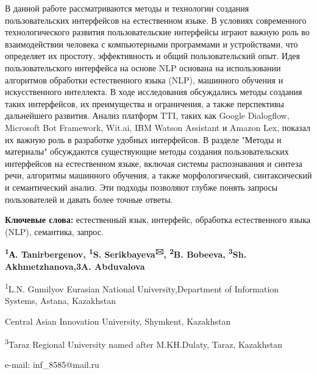 В данной работе рассматриваются методы и технологии создания
пользовательских интерфейсов на естественном языке. В условиях
современного технологического развития пользовательские интерфейсы
играют важную роль во взаимодействии человека с компьютерными
программами и устройствами, что определяет их простоту, эффективность и
общий пользовательский опыт. Идея пользовательского интерфейса на основе
NLP основана на использовании алгоритмов обработки естественного языка
(NLP), машинного обучения и искусственного интеллекта. В ходе
исследования обсуждались методы создания таких интерфейсов, их
преимущества и ограничения, а также перспективы дальнейшего развития.
Анализ платформ TTI, таких как Google Dialogflow, Microsoft Bot
Framework, Wit.ai, IBM Watson Assistant и Amazon Lex, показал их важную
роль в разработке удобных интерфейсов. В разделе "Методы и материалы"
обсуждаются существующие методы создания пользовательских интерфейсов на
естественном языке, включая системы распознавания и синтеза речи,
алгоритмы машинного обучения, а также морфологический, синтаксический и
семантический анализ. Эти подходы позволяют глубже понять запросы
пользователей и давать более точные ответы.

{\bfseries Ключевые слова:} естественный язык, интерфейс, обработка
естественного языка (NLP), семантика, запрос.

\begin{center}
{\bfseries \textsuperscript{1}А. Tanirbergenov, \textsuperscript{1}S.
Serikbayeva\textsuperscript{🖂}, \textsuperscript{2}B. Bobeeva,
\textsuperscript{3}Sh. Akhmetzhanova,{3}A. Abduvalova}

\textsuperscript{1}L.N. Gumilyov Eurasian National University,Department
of Information Systems, Astana, Kazakhstan

Central Asian Innovation University, Shymkent, Kazakhstan

\textsuperscript{3}Taraz Regional University named after M.KH.Dulaty,
Taraz, Kazakhstan

e-mail: inf\_8585@mail.ru
\end{center}

